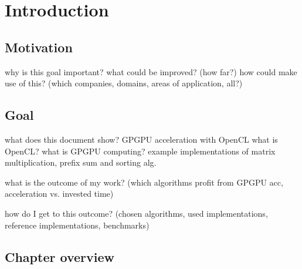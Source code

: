 \section{Introduction}


\subsection{Motivation}
why is this goal important?
what could be improved? (how far?)
how could make use of this? (which companies, domains, areas of application, all?)

\subsection{Goal}
what does this document show?
GPGPU acceleration with OpenCL
what is OpenCL? what is GPGPU computing?
example implementations of matrix multiplication, prefix sum and sorting alg.

what is the outcome of my work? (which algorithms profit from GPGPU acc, acceleration vs. invested time)


how do I get to this outcome? (chosen algorithms, used implementations, reference implementations, benchmarks)

\subsection{Chapter overview}


